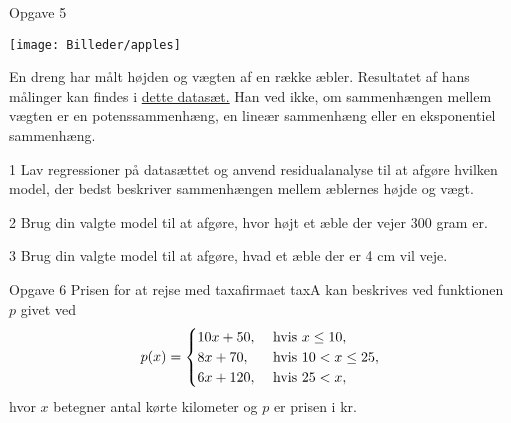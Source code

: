 \begin{opgavetekst}{Opgave 5}
	\begin{center}
		\texttt{[image: Billeder/apples]}
	\end{center}	
	En dreng har målt højden og vægten af en række æbler. Resultatet af hans målinger kan 
	findes i \href{https://github.com/ChristianJLex/TeachingNotes/raw/master/2023-2024/Data og lign/aeble.xlsx}{\color{blue!60} dette datasæt.} Han ved ikke, om sammenhængen mellem vægten er en potenssammenhæng, en lineær sammenhæng eller en eksponentiel sammenhæng.
\end{opgavetekst}
\begin{delopgave}{}{1}
	Lav regressioner på datasættet og anvend residualanalyse til at afgøre hvilken model, der 
	bedst beskriver sammenhængen mellem æblernes højde og vægt.
\end{delopgave}	
\begin{delopgave}{}{2}
	Brug din valgte model til at afgøre, hvor højt et æble der vejer 300 gram er.
\end{delopgave}
\begin{delopgave}{}{3}
	Brug din valgte model til at afgøre, hvad et æble der er 4 cm vil veje.
\end{delopgave}
\begin{opgavetekst}{Opgave 6}
	Prisen for at rejse med taxafirmaet taxA kan beskrives ved funktionen $p$ givet ved
	\begin{align*}
		p(x) = \begin{cases}
			10x + 50, &\textnormal{ hvis } x \leq 10, \\
			8x + 70,  &\textnormal{ hvis } 10 < x \leq 25, \\
			6x + 120, &\textnormal{ hvis } 25 < x,
		\end{cases}
	\end{align*}
hvor $x$ betegner antal kørte kilometer og $p$ er prisen i kr.
\end{opgavetekst}
